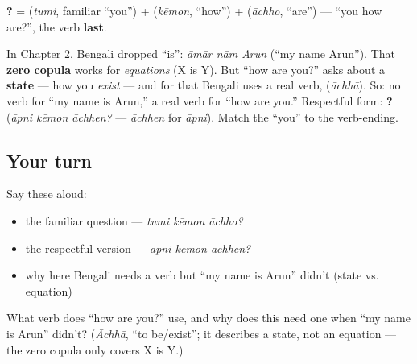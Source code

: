 \begin{cousinweb}
\textbf{  ?} = \textbf{} (\emph{tumi}, familiar \textquotedblleft{}you\textquotedblright{}) + \textbf{} (\emph{kēmon}, \textquotedblleft{}how\textquotedblright{}) + \textbf{} (\emph{āchho}, \textquotedblleft{}are\textquotedblright{}) — \textquotedblleft{}you how are?\textquotedblright{}, the verb \textbf{last}.
\end{cousinweb}

\begin{grammarlens}[title={Grammar Lens: now the copula returns}]
In Chapter 2, Bengali dropped \textquotedblleft{}is\textquotedblright{}: \emph{āmār nām Arun} (\textquotedblleft{}my name Arun\textquotedblright{}). That \textbf{zero copula} works for \emph{equations} (X is Y). But \textquotedblleft{}how are you?\textquotedblright{} asks about a \textbf{state} — how you \emph{exist} — and for that Bengali uses a real verb, \textbf{} (\emph{āchhā}). So: no verb for \textquotedblleft{}my name is Arun,\textquotedblright{} a real verb for \textquotedblleft{}how are you.\textquotedblright{} Respectful form: \textbf{  ?} (\emph{āpni kēmon āchhen?} — \emph{āchhen} for \emph{āpni}). Match the \textquotedblleft{}you\textquotedblright{} to the verb-ending.
\end{grammarlens}

\subsection*{Your turn}
Say these aloud:

\begin{itemize}
\raggedright
  \item the familiar question — \emph{tumi kēmon āchho?}
  \item the respectful version — \emph{āpni kēmon āchhen?}
  \item why here Bengali needs a verb but \textquotedblleft{}my name is Arun\textquotedblright{} didn't (state vs. equation)
\end{itemize}

\begin{tcolorbox}[breakable,colback=teal!4,colframe=teal!35!black,title={Before you move on}]
What verb does \textquotedblleft{}how are you?\textquotedblright{} use, and why does this need one when \textquotedblleft{}my name is Arun\textquotedblright{} didn't? (\emph{Āchhā}, \textquotedblleft{}to be/exist\textquotedblright{}; it describes a state, not an equation — the zero copula only covers X is Y.)
\end{tcolorbox}
